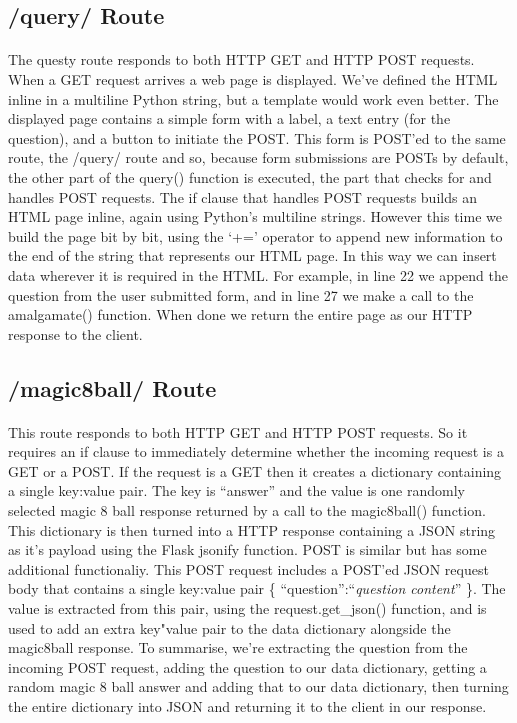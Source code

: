 \subsection{/query/ Route}
\paragraph{} The questy route responds to both HTTP GET and HTTP POST requests. When a GET request arrives a web page is displayed. We've defined the HTML inline in a multiline Python string, but a template would work even better. The displayed page contains a simple form with a label, a text entry (for the question), and a button to initiate the POST. This form is POST'ed to the same route, the /query/ route and so, because form submissions are POSTs by default, the other part of the query() function is executed, the part that checks for and handles POST requests. The if clause that handles POST requests builds an HTML page inline, again using Python's multiline strings. However this time we build the page bit by bit, using the `+=' operator to append new information to the end of the string that represents our HTML page. In this way we can insert data wherever it is required in the HTML. For example, in line 22 we append the question from the user submitted form, and in line 27 we make a call to the amalgamate() function. When done we return the entire page as our HTTP response to the client.

\subsection{/magic8ball/ Route}
\paragraph{} This route responds to both HTTP GET and HTTP POST requests. So it requires an if clause to immediately determine whether the incoming request is a GET or a POST. If the request is a GET then it creates a dictionary containing a single key:value pair. The key is ``answer'' and the value is one randomly selected magic 8 ball response returned by a call to the magic8ball() function. This dictionary is then turned into a HTTP response containing a JSON string as it's payload using the Flask jsonify function. POST is similar but has some additional functionaliy. This POST request includes a POST'ed JSON request body that contains a single key:value pair \{ ``question'':``\emph{question content}'' \}. The value is extracted from this pair, using the request.get\_json() function, and is used to add an extra key"value pair to the data dictionary alongside the magic8ball response. To summarise, we're extracting the question from the incoming POST request, adding the question to our data dictionary, getting a random magic 8 ball answer and adding that to our data dictionary, then turning the entire dictionary into JSON and returning it to the client in our response.

